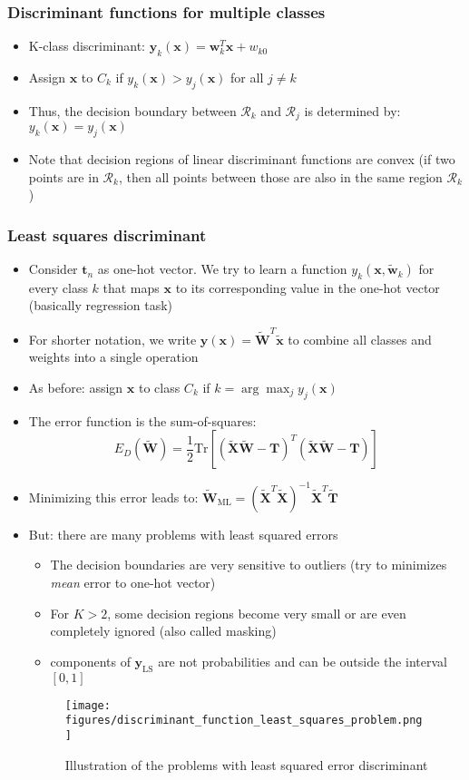 \subsubsection{Discriminant functions for multiple classes}
\begin{itemize}
	\item K-class discriminant: $\bm{y}_k (\bm{x}) = \bm{w}_k^T \bm{x} + w_{k0}$
	\item Assign $\bm{x}$ to $C_k$ if $y_k(\bm{x})>y_j(\bm{x})$ for all $j\neq k$
	\item Thus, the decision boundary between $\mathcal{R}_k$ and $\mathcal{R}_j$ is determined by: $y_k(\bm{x})=y_j(\bm{x})$
	\item Note that decision regions of linear discriminant functions are convex (if two points are in $\mathcal{R}_k$, then all points between those are also in the same region $\mathcal{R}_k$)
\end{itemize}
\subsubsection{Least squares discriminant}
\begin{itemize}
	\item Consider $\bm{t}_n$ as one-hot vector. We try to learn a function $y_k(\bm{x}, \bm{\tilde{w}}_k)$ for every class $k$ that maps $\bm{x}$ to its corresponding value in the one-hot vector (basically regression task)
	\item For shorter notation, we write $\bm{y}(\bm{x}) = \bm{\tilde{W}}^T\bm{\tilde{x}}$ to combine all classes and weights into a single operation
	\item As before: assign $\bm{x}$ to class $C_k$ if $k=\arg\max_j y_j (\bm{x})$
	\item The error function is the sum-of-squares: $$E_D(\bm{\tilde{W}}) = \frac{1}{2} \text{Tr}\left[\left(\bm{\tilde{X}}\bm{\tilde{W}}-\bm{T}\right)^T\left(\bm{\tilde{X}}\bm{\tilde{W}}-\bm{T}\right)\right]$$
	\item Minimizing this error leads to:  $\bm{\tilde{W}}_{\text{ML}} = \left(\bm{\tilde{X}}^T \bm{\tilde{X}}\right)^{-1}\bm{\tilde{X}}^T \bm{\tilde{T}}$
	\item But: there are many problems with least squared errors
	\begin{itemize}
		\item The decision boundaries are very sensitive to outliers (try to minimizes \textit{mean} error to one-hot vector)
		\item For $K>2$, some decision regions become very small or are even completely ignored (also called masking)
		\item components of $\bm{y}_{\text{LS}}$ are not probabilities and can be outside the interval $\left[0,1\right]$
	\end{itemize}
	\begin{figure}[ht]
		\centering
		\texttt{[image: figures/discriminant\_function\_least\_squares\_problem.png]}
		\caption{Illustration of the problems with least squared error discriminant}
		\label{img:discriminant_function_least_squares_problem}
	\end{figure}
\end{itemize}
